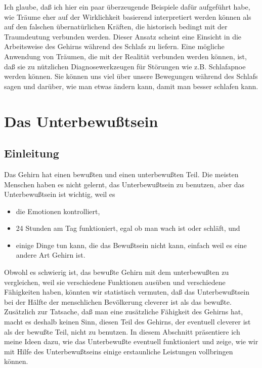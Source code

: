 Ich glaube, daß ich hier ein paar überzeugende Beispiele dafür aufgeführt habe, wie Träume eher auf der Wirklichkeit basierend interpretiert werden können als auf den falschen übernatürlichen Kräften, die historisch bedingt mit der Traumdeutung verbunden werden.
 Dieser Ansatz scheint eine Einsicht in die Arbeitsweise des Gehirns während des Schlafs zu liefern.
 Eine mögliche Anwendung von Träumen, die mit der Realität verbunden werden können, ist, daß sie zu nützlichen Diagnosewerkzeugen für Störungen wie z.B. Schlafapnoe werden können.
 Sie können uns viel über unsere Bewegungen während des Schlafs sagen und darüber, wie man etwas ändern kann, damit man besser schlafen kann.
 
\hypertarget{c3_6}{}

\section{Das Unterbewußtsein}\hypertarget{c3_6a}{}

\subsection{Einleitung}

Das Gehirn hat einen bewußten und einen unterbewußten Teil.
 Die meisten Menschen haben es nicht gelernt, das Unterbewußtsein zu benutzen, aber das Unterbewußtsein ist wichtig, weil es
 
\begin{itemize}
	\item die Emotionen kontrolliert,
	\item 24 Stunden am Tag funktioniert, egal ob man wach ist oder schläft, und
	\item einige Dinge tun kann, die das Bewußtsein nicht kann, einfach weil es eine andere Art Gehirn ist.
\end{itemize}

Obwohl es schwierig ist, das bewußte Gehirn mit dem unterbewußten zu vergleichen, weil sie verschiedene Funktionen ausüben und verschiedene Fähigkeiten haben, könnten wir statistisch vermuten, daß das Unterbewußtsein bei der Hälfte der menschlichen Bevölkerung cleverer ist als das bewußte.
 Zusätzlich zur Tatsache, daß man eine zusätzliche Fähigkeit des Gehirns hat, macht es deshalb keinen Sinn, diesen Teil des Gehirns, der eventuell cleverer ist als der bewußte Teil, nicht zu benutzen.
 In diesem Abschnitt präsentiere ich meine Ideen dazu, wie das Unterbewußte eventuell funktioniert und zeige, wie wir mit Hilfe des Unterbewußtseins einige erstaunliche Leistungen vollbringen können.
 \hypertarget{c3_6b}{}

